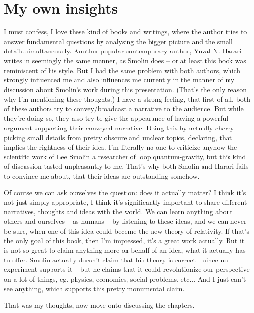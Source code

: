 \section{My own insights}
I must confess, I love these kind of books and writings, where the author tries to answer fundamental questions by analysing the bigger picture and the small details simultaneously. Another popular contemporary author, Yuval N. Harari writes in seemingly the same manner, as Smolin does -- or at least this book was reminiscent of his style. But I had the same problem with both authors, which strongly influenced me and also influences me currently in the manner of my discussion about Smolin's work during this presentation. (That's the only reason why I'm mentioning these thoughts.) I have a strong feeling, that first of all, both of these authors try to convey/broadcast a narrative to the audience. But while they're doing so, they also try to give the appearance of having a powerful argument supporting their conveyed narrative. Doing this by actually cherry picking small details from pretty obscure and unclear topics, declaring, that  implies the rightness of their idea. I'm literally no one to criticize anyhow the scientific work of Lee Smolin a researcher of loop quantum-gravity, but this kind of discussion tasted unpleasantly  to me. That's why both Smolin and Harari fails to convince me about, that their ideas are outstanding somehow. \par
Of course we can ask ourselves the question: does it actually matter? I think it's not just simply appropriate, I think it's significantly important to share different narratives, thoughts and ideas with the world. We can learn anything about others and ourselves -- as humans -- by listening to these ideas, and we can never be sure, when one of this idea could become the new theory of relativity. If that's the only goal of this book, then I'm impressed, it's a great work actually. But it is not so great to claim anything more on behalf of an idea, what it actually has to offer. Smolin actually doesn't claim that his theory is correct -- since no experiment supports it -- but he claims that it could revolutionize our perspective on a lot of things, eg. physics, economics, social problems, etc... And I just can't see anything, which supports this pretty monumental claim. \par
That was my thoughts, now move onto discussing the chapters.


